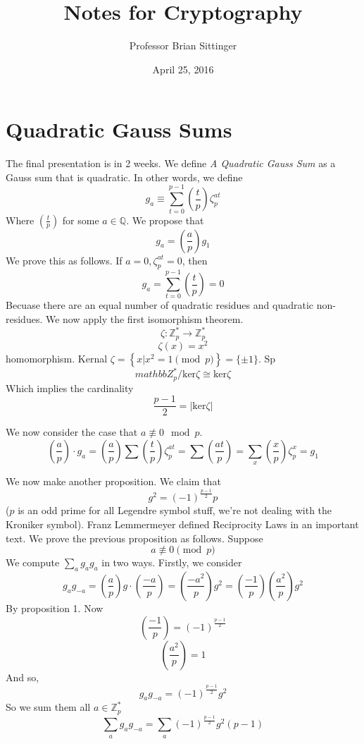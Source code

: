 \documentclass{article}
\title{Notes for Cryptography}
\author{Professor Brian Sittinger}
\date{April 25, 2016}
\begin{document}
\maketitle
\section{Quadratic Gauss Sums}
The final presentation is in 2 weeks. We define \emph{A Quadratic Gauss Sum} as
a Gauss sum that is quadratic. In other words, we define
\[ g_{a} \equiv \sum_{t = 0}^{p-1} \left( \frac{t}{p} \right) \zeta_p^{at} \]
Where $\left(\frac{t}{p}\right)$ for some $a \in \mathbb{Q}$.
We propose that
\[ g_a = \left( \frac{a}{p} \right) g_{1} \]
We prove this as follows. If $a = 0, \zeta_p^{at} = 0$, then
\[ g_a = \sum_{t = 0}^{p-1} \left( \frac{t}{p} \right) = 0 \]
Becuase there are an equal number of quadratic residues and quadratic
non-residues. We now apply the first isomorphism theorem. 
\[ \zeta : \mathbb{Z}_p^* \rightarrow \mathbb{Z}_p^* \]
\[ \zeta(x) = x^2 \]
homomorphism. Kernal $\zeta = \left\{ x | x^2 = 1 \pmod{p} \right\} = \{ \pm 1
\} $. Sp
\[ mathbb{Z}_p^* / \text{ker}\zeta \cong \text{ker}\zeta \]
Which implies the cardinality
\[ \frac{p-1}{2} = |\text{ker} \zeta| \]

We now consider the case that $a \not\equiv 0 \mod{p}$. 
\[ \left(\frac{a}{p}\right) \cdot g_a = \left(\frac{a}{p}\right)
\sum\left(\frac{t}{p}\right)\zeta_p^{at} =
\sum\left(\frac{at}{p}\right) = \sum_x \left(\frac{x}{p}\right) \zeta^x_p = g_1
\]

We now make another proposition. We claim that
\[ g^2 = (-1)^{\frac{p-1}{2}} p \]
($p$ is an odd prime for all Legendre symbol stuff, we're not dealing with the
Kroniker symbol). Franz Lemmermeyer defined Reciprocity Laws in an important
text. We prove the previous proposition as follows. Suppose
\[ a \not\equiv 0 \pmod{p} \]
We compute $\sum_{a} g_a g_a $ in two ways. Firstly, we consider
\[ g_a g_{-a} = \left(\frac{a}{p}\right)g\cdot\left(\frac{-a}{p}\right) =
\left(\frac{-a^2}{p}\right)g^2 = \left(\frac{-1}{p}\right)
\left(\frac{a^2}{p}\right) g^2  \] 
By proposition 1. Now
\[ \left(\frac{-1}{p}\right) = (-1)^{\frac{p-1}{2}} \]
\[ \left(\frac{a^2}{p}\right) = 1 \]
And so, 
\[ g_a g_{-a} = (-1)^{\frac{p-1}{2}} g^2 \]
So we sum them all $a \in \mathbb{Z}_p^*$
\[ \sum_{a} g_a g_{-a}  = \sum_a (-1)^{\frac{p-1}{2}} g^2(p-1) \]
\end{document}
